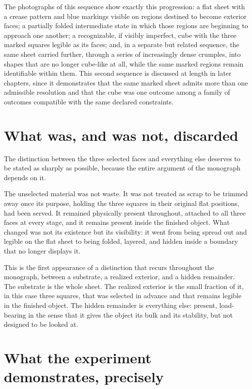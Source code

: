 \documentclass[11pt,oneside]{book}
\begin{document}
The photographs of this sequence show exactly this progression: a flat
sheet with a crease pattern and blue markings visible on regions
destined to become exterior faces; a partially folded intermediate state
in which those regions are beginning to approach one another; a
recognizable, if visibly imperfect, cube with the three marked squares
legible as its faces; and, in a separate but related sequence, the same
sheet carried further, through a series of increasingly dense crumples,
into shapes that are no longer cube-like at all, while the same marked
regions remain identifiable within them. This second sequence is
discussed at length in later chapters, since it demonstrates that the
same marked sheet admits more than one admissible resolution and that
the cube was one outcome among a family of outcomes compatible with the
same declared constraints.

\hypertarget{what-was-and-was-not-discarded}{%
\section{What was, and was not,
discarded}\label{what-was-and-was-not-discarded}}

The distinction between the three selected faces and everything else
deserves to be stated as sharply as possible, because the entire
argument of the monograph depends on it.

The unselected material was not waste. It was not treated as scrap to be
trimmed away once its purpose, holding the three squares in their
original flat positions, had been served. It remained physically present
throughout, attached to all three faces at every stage, and it remains
present inside the finished object. What changed was not its existence
but its visibility: it went from being spread out and legible on the
flat sheet to being folded, layered, and hidden inside a boundary that
no longer displays it.

This is the first appearance of a distinction that recurs throughout the
monograph, between a substrate, a realized exterior, and a hidden
remainder. The substrate is the whole sheet. The realized exterior is
the small fraction of it, in this case three squares, that was selected
in advance and that remains legible in the finished object. The hidden
remainder is everything else: present, load-bearing in the sense that it
gives the object its bulk and its stability, but not designed to be
looked at.

\hypertarget{what-the-experiment-demonstrates-precisely}{%
\section{What the experiment demonstrates,
precisely}\label{what-the-experiment-demonstrates-precisely}}
\end{document}
